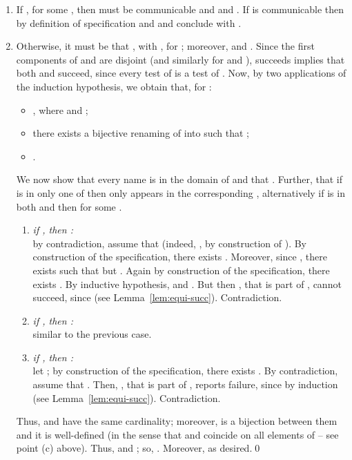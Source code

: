 \documentclass{LMCS}
\begin{document}
\begin{enumerate}
\item If , for some , then  must be communicable and
	 and .
    If  is communicable then by definition of specification
     and 
    and conclude with .

\item Otherwise, it must be that , with
	, for ; moreover,
	 and .
	Since the first components of  and  are disjoint (and similarly for  and ),
	 succeeds implies that both  and
	 succeed, since every test of 
	is a test of . Now, by two applications of the induction hypothesis,
	we obtain that, for :
	\begin{itemize}
	\item , where  and ; 
	\item there exists a bijective renaming  of  into 
	such that ;
	\item .
	\end{itemize}
    We now show that every name  is in the domain of  and that .
    Further, that if  is in only one of  then  only appears in the
    corresponding , alternatively if  is in both  and  then 
    for some .
	\begin{enumerate}
	\item {\em if , then :}\\
		by contradiction, assume that  (indeed, 
		, by construction of ). By construction of the specification,
		there exists . Moreover, since , there exists 
		such that  but . Again by construction of the specification,
		there exists . By inductive hypothesis,  
		and . But then , that
		is part of , cannot succeed, since 
		(see Lemma~\ref{lem:equi-succ}). Contradiction.
	\item {\em if , then :}\\
		similar to the previous case.
	\item {\em if , then :}\\
		let ; by construction of the specification,
		there exists . By contradiction, assume that .
		Then, , that is part of , 
		reports failure, since by induction 
		(see Lemma~\ref{lem:equi-succ}). Contradiction.
	\end{enumerate}
	Thus,  and  have the same cardinality; moreover,  is a
	bijection between them and it is well-defined (in the sense that  and  coincide on all elements
	of  -- see point (c) above). 
	Thus,  and ;
	so, . Moreover, 
 as desired.\qed
\end{enumerate}
\enlargethispage{\baselineskip}
\end{document}
